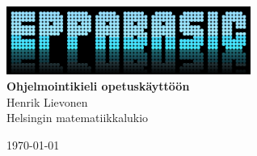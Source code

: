 \begin{titlepage}
	\begin{center}
		\vspace*{\fill}
	
		\includegraphics[width=0.6\textwidth]{logo}~\\[1cm]
		
		{\huge \bfseries Ohjelmointikieli opetuskäyttöön} \\[0.4cm]
		
		{\Large Henrik Lievonen\\
		Helsingin matematiikkalukio}
		
		{\large \today}
		
		\vfill		
	\end{center}
\end{titlepage}